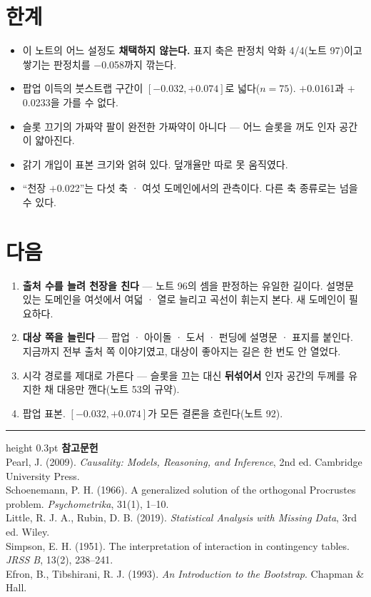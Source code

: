 \documentclass[10pt]{article}
\begin{document}
\section{한계}

\begin{itemize}[leftmargin=1.1em,itemsep=0.15em]
\item 이 노트의 어느 설정도 \textbf{채택하지 않는다.} 표지 축은 판정치 악화
      4/4(노트 97)이고 쌓기는 판정치를 $-$0.058까지 깎는다.
\item 팝업 이득의 붓스트랩 구간이 $[-0.032, +0.074]$로 넓다($n{=}75$).
      $+$0.0161과 $+$0.0233을 가를 수 없다.
\item 슬롯 끄기의 가짜약 팔이 완전한 가짜약이 아니다 --- 어느 슬롯을 꺼도
      인자 공간이 얇아진다.
\item 갉기 개입이 표본 크기와 얽혀 있다. 덮개율만 따로 못 움직였다.
\item ``천장 $+$0.022''는 다섯 축 · 여섯 도메인에서의 관측이다. 다른 축
      종류로는 넘을 수 있다.
\end{itemize}

\section{다음}

\begin{enumerate}[leftmargin=1.3em,itemsep=0.15em]
\item \textbf{출처 수를 늘려 천장을 친다} --- 노트 96의 셈을 판정하는 유일한
      길이다. 설명문 있는 도메인을 여섯에서 여덟 · 열로 늘리고 곡선이 휘는지
      본다. 새 도메인이 필요하다.
\item \textbf{대상 쪽을 늘린다} --- 팝업 · 아이돌 · 도서 · 펀딩에 설명문 ·
      표지를 붙인다. 지금까지 전부 출처 쪽 이야기였고, 대상이 좋아지는 길은
      한 번도 안 열었다.
\item 시각 경로를 제대로 가른다 --- 슬롯을 끄는 대신 \textbf{뒤섞어서}
      인자 공간의 두께를 유지한 채 대응만 깬다(노트 53의 규약).
\item 팝업 표본. $[-0.032, +0.074]$가 모든 결론을 흐린다(노트 92).
\end{enumerate}

\vspace{0.6em}
\hrule height 0.3pt
\vspace{0.5em}
{\footnotesize
\textbf{참고문헌}\\[0.3em]
Pearl, J. (2009). \emph{Causality: Models, Reasoning, and Inference}, 2nd ed.
Cambridge University Press.\\[0.15em]
Schoenemann, P. H. (1966). A generalized solution of the orthogonal Procrustes
problem. \emph{Psychometrika}, 31(1), 1--10.\\[0.15em]
Little, R. J. A., Rubin, D. B. (2019). \emph{Statistical Analysis with Missing
Data}, 3rd ed. Wiley.\\[0.15em]
Simpson, E. H. (1951). The interpretation of interaction in contingency tables.
\emph{JRSS B}, 13(2), 238--241.\\[0.15em]
Efron, B., Tibshirani, R. J. (1993). \emph{An Introduction to the Bootstrap}.
Chapman \& Hall.
}
\end{document}
